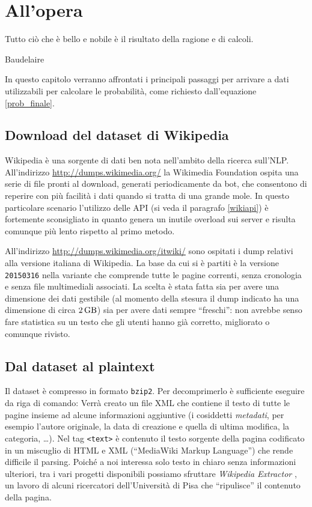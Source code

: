 \chapter{All'opera}
\epigraph{Tutto ciò che è bello e nobile è il risultato della ragione e di calcoli.}{Baudelaire}

In questo capitolo verranno affrontati i principali passaggi per arrivare a dati utilizzabili per calcolare le probabilità, come richiesto dall'equazione \eqref{prob_finale}.

\section{Download del dataset di Wikipedia}
\label{dump}
Wikipedia è una sorgente di dati ben nota nell'ambito della ricerca sull'NLP. All'indirizzo \url{http://dumps.wikimedia.org/} la Wikimedia Foundation ospita una serie di file pronti al download, generati periodicamente da bot, che consentono di reperire con più facilità i dati quando si tratta di una grande mole. In questo particolare scenario l'utilizzo delle API (si veda il paragrafo \ref{wikiapi}) è fortemente sconsigliato in quanto genera un inutile overload sui server e risulta comunque più lento rispetto al primo metodo.

All'indirizzo \url{http://dumps.wikimedia.org/itwiki/} sono ospitati i dump relativi alla versione italiana di Wikipedia. La base da cui si è partiti è la versione \texttt{20150316} nella variante che comprende tutte le pagine correnti, senza cronologia e senza file multimediali associati. La scelta è stata fatta sia per avere una dimensione dei dati gestibile (al momento della stesura il dump indicato ha una dimensione di circa $\SI{2}{\giga\byte}$) sia per avere dati sempre ``freschi'': non avrebbe senso fare statistica su un testo che gli utenti hanno già corretto, migliorato o comunque rivisto.

\section{Dal dataset al plaintext}

Il dataset è compresso in formato \texttt{bzip2}. Per decomprimerlo è sufficiente eseguire da riga di comando:
Verrà creato un file XML che contiene il testo di tutte le pagine insieme ad alcune informazioni aggiuntive (i cosiddetti \emph{metadati}, per esempio l'autore originale, la data di creazione e quella di ultima modifica, la categoria, \dots).
Nel tag \texttt{<text>} è contenuto il testo sorgente della pagina codificato in un miscuglio di HTML e XML (``MediaWiki Markup Language'') che rende difficile il parsing. Poiché a noi interessa solo testo in chiaro senza informazioni ulteriori, tra i vari progetti disponibili possiamo sfruttare \emph{Wikipedia Extractor} \cite{WikiExtractorUniPi}, un lavoro di alcuni ricercatori dell'Università di Pisa che ``ripulisce'' il contenuto della pagina.

